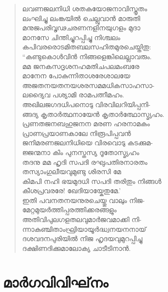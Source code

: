 \begin{verse}
ലവണജലനിധി ശതകയോജനാവിസ്തൃതം\\
ലംഘിച്ചു ലംങ്കയില്‍ ചെല്ലുവാന്‍ മാരുതി\\
മനുജപരിവൃഢചരണനളിനയുഗളം മുദാ\\
മാനസേ ചിന്തിച്ചുറപ്പിച്ചു നിശ്ചലം\\
കപിവരരൊടമിതബലസഹിതമുരചെയ്തിതു:\\
“കണ്ടുകൊള്‍വിന്‍ നിങ്ങളെങ്കിലെല്ലാവരും.\\
മമ ജനകസദൃശനഹമതിചപലമംബരേ\\
മാനേന പോകുന്നിതാശരേശാലയേ\\
അജതനയതനയശരസമമധികസാഹസാ-\\
ലദ്യൈവ പശ്യാമി രാമപത്നീമഹം.\\
അഖിലജഗദധിപനൊടു വിരവിലറിയിപ്പനി-\\
ങ്ങദ്യ കൃതാര്‍ത്ഥനായേന്‍ കൃതാര്‍ത്ഥോസ്മ്യഹം.\\
പ്രണതജനബഹുജനന മരണ ഹരനാമകം\\
പ്രാണപ്രയാണകാലേ നിരൂപിപ്പവന്‍\\
ജനിമരണജലനിധിയെ വിരവൊടു കടക്കുമ-\\
ജ്ജന്മനാ കിം പുനസ്തസ്യ ദൂതോസ്മ്യഹം\\
തദനു മമ ഹൃദി സപദി രഘുപതിരനാരതം\\
തസ്യാംഗുലീയവുമുണ്ടു ശിരസി മേ\\
കിമപി നഹി ഭയമുദധി സപദി തരിതും നിങ്ങള്‍\\
കീശപ്രവരരേ! ഖേദിയായ്കേതുമേ.’\\
ഇതി പവനതനയനുരചെയ്തു വാലും നിജ-\\
മേറ്റമുയര്‍ത്തിപ്പരത്തിക്കരങ്ങളും\\
അതിവിപുലഗളതലവുമാര്‍ജവമാക്കി നി-\\
ന്നാകുഞ്ചിതാംഘ്രിയായൂര്‍ദ്ധ്വനയനനായ്\\
ദശവദനപുരിയില്‍ നിജ ഹൃദയവുമുറപ്പിച്ചു\\
ദക്ഷിണദിക്കുമാലോക്യ ചാടീടിനാന്‍.
\end{verse}


\section{മാര്‍ഗവിവിഘ്‌നം}

